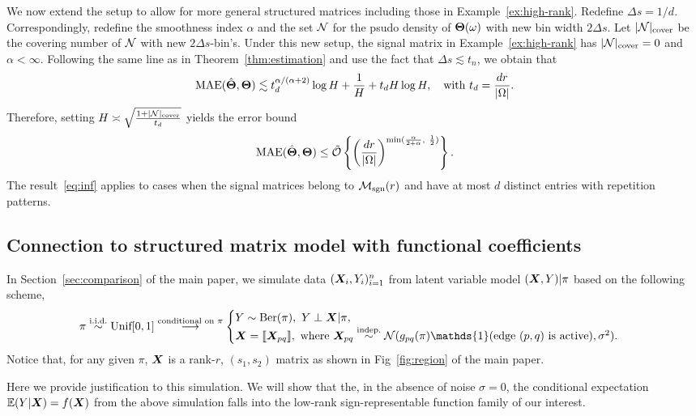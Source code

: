 \documentclass[11pt]{article}
\theoremstyle{plain}
\theoremstyle{definition}
\def\caliM{\tM_{\textup{sgn}}}
\def\caliM{\tM_{\textup{sgn}}}
\begin{document}
We now extend the setup to allow for more general structured matrices including those in Example~\ref{ex:high-rank}. Redefine $\Delta s = {1/d}$. Correspondingly, redefine the smoothness index $\alpha$ and the set $\mathcal{N}$ for the psudo density of $\bm{\Theta}(\omega)$ with new bin width $2\Delta s$. Let $|\mathcal{N}|_{\text{cover}}$ be the covering number of $\mathcal{N}$ with new $2\Delta s$-bin's. Under this new setup, the signal matrix in Example~\ref{ex:high-rank} has $|\mathcal{N}|_{\text{cover}}=0$ and $\alpha<\infty$. Following the same line as in Theorem~\ref{thm:estimation} and use the fact that $\Delta s\lesssim t_n$, we obtain that
\[
\textup{MAE}(\hat {\bm{\Theta}}, \bm{\Theta})\lesssim t^{\alpha/(\alpha+2)}_d\log H +{1\over H}+t_dH\log H,\quad \text{with }t_d={d r\over |\Omega|}.
\]
Therefore, setting $H\asymp \sqrt{1+|\mathcal{N}|_{\text{cover}}\over t_d}$ yields the error bound
\begin{equation}\label{eq:inf}
\textup{MAE}(\hat {\bm{\Theta}}, \bm{\Theta})\leq \tilde{\mathcal{O}}\left\{\left( {dr\over |\Omega|}\right)^{\min({\alpha\over 2+\alpha},\ {1\over 2})}\right\}.
\end{equation}
The result~\eqref{eq:inf} applies to cases when the signal matrices belong to $\caliM(r)$ and have at most $d$ distinct entries with repetition patterns. 


\subsection{Connection to structured matrix model with functional coefficients}\label{sec:joint}
In Section~\ref{sec:comparison} of the main paper, we simulate data $(\bm X_i,Y_i)_{i=1}^n$ from latent variable model $(\bm X,Y)|\pi$ based on the following scheme,
\[
\pi \stackrel{\text{i.i.d.}}{\sim} \text{Unif}[0,1] \stackrel{\text{conditional on $\pi$}}{\longrightarrow}
\begin{cases}
Y\sim \text{Ber}(\pi),\ Y\perp \mX|\pi, \\
\mX=\entry{\mX_{pq}}, \ \text{where\ } \mX_{pq}\stackrel{\text{indep.}}{\sim} \tN(g_{pq}(\pi)\mathds{1}(\text{edge $(p,q)$ is active}), \sigma^2).
\end{cases}
\]
Notice that, for any given $\pi$, $\bm X$ is a rank-$r$, $(s_1,s_2)$ matrix as shown in Fig~\ref{fig:region} of the main paper. 

Here we provide justification to this simulation. We will show that the, in the absence of noise $\sigma=0$, the conditional expectation $\mathbb{E}(Y|\bm X)=f(\bm X)$ from the above simulation falls into the low-rank sign-representable function family of our interest. 
\end{document}
